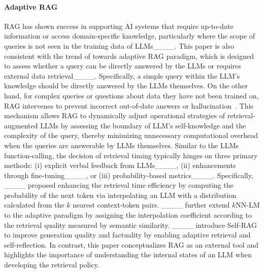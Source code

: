 \paragraph{Adaptive RAG}
RAG has shown success in supporting AI systems that require up-to-date information or access domain-specific knowledge, particularly where the scope of queries is not seen in the training data of LLMs____. This paper is also consistent with the trend of towards adaptive RAG paradigm, which is designed to assess whether a query can be directly answered by the LLMs or requires external data retrieval____. Specifically, a simple query within the LLM's knowledge should be directly answered by the LLMs themselves. On the other hand, for complex queries or questions about data they have not been trained on, RAG intervenes to prevent incorrect out-of-date answers or hallucination~\citep {JiSurvey}. This mechanism allows RAG to dynamically adjust operational strategies of retrieval-augmented LLMs by assessing the boundary of LLM's self-knowledge and the complexity of the query, thereby minimizing unnecessary computational overhead when the queries are answerable by LLMs themselves. 
Similar to the LLMs function-calling, the decision of retrieval timing typically hinges on three primary methods: (i) explicit verbal feedback from LLMs____, (ii) enhancements through fine-tuning____, or (iii) probability-based metrics____. Specifically, ____ proposed enhancing the retrieval time efficiency by computing the probability of the next token via interpolating an LLM with a distribution calculated from the $k$ nearest context-token pairs. ____ further extend $k$NN-LM to the adaptive paradigm by assigning the interpolation coefficient according to the retrieval quality measured by semantic similarity. ____ introduce Self-RAG to improve generation quality and factuality by enabling adaptive retrieval and self-reflection. In contrast, this paper conceptualizes RAG as an external tool and highlights the importance of understanding the internal states of an LLM when developing the retrieval policy. 

